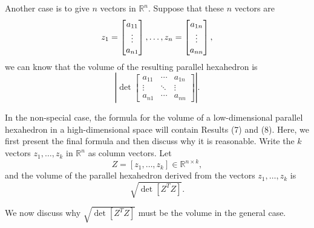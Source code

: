 \documentclass[10pt]{article} %
\begin{document}
Another case is to give $n$ vectors in ${\mathbb{R}^n}$. Suppose that these $n$ vectors are
\[{z_1} = \left[\!\!\! {\begin{array}{{c}}
{{a_{11}}}\\
 \vdots \\
{{a_{n1}}}
\end{array}}\!\!\! \right], \ldots ,{z_n} = \left[\!\!\! {\begin{array}{{c}}
{{a_{1n}}}\\
 \vdots \\
{{a_{nn}}}
\end{array}}\!\!\! \right],\]
we can know that the volume of the resulting parallel hexahedron is \begin{equation}\left| {\left. {\det \!\left[\! {\begin{array}{*{20}{c}}
{{a_{11}}}& \cdots &{{a_{1n}}}\\
 \vdots & \ddots & \vdots \\
{{a_{n1}}}& \cdots &{{a_{nn}}}
\end{array}} \!\right]} \right|.} \right.\end{equation}


In the non-special case, the formula for the volume of a low-dimensional parallel hexahedron in a high-dimensional space will contain Results (7) and (8). Here, we first present the final formula and then discuss why it is reasonable. Write the $k$ vectors ${z_1}, \ldots ,{z_k}$ in ${\mathbb{R}^n}$ as column vectors. Let \[Z = \left[ {{z_1}, \ldots ,{z_k}} \right] \in {\mathbb{R}^{n \times k}},\]
and the volume of the parallel hexahedron derived from the vectors ${z_1}, \ldots ,{z_k}$ is \[\sqrt {\det\! \left[ {{Z^T}\!Z} \right]}. \]

We now discuss why $\sqrt {\det\! \left[ {{Z^T}\!Z} \right]}$ must be the volume in the general case.
\end{document}
